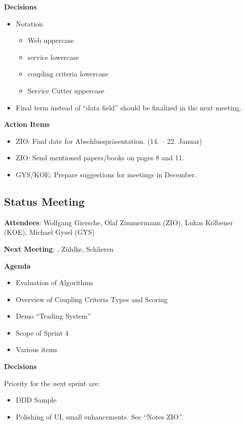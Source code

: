 \textbf{Decisions}

\begin{itemize}
\item Notation
	\begin{itemize}
	\item Web uppercase
	\item service lowercase
	\item coupling criteria lowercase
	\item Service Cutter uppercase
	\end{itemize}
\item Final term instead of \enquote{data field} should be finalized in the next meeting.
\end{itemize}
 
\textbf{Action Items}

\begin{itemize}
\item ZIO: Find date for Abschlusspräsentation. (14. – 22. Januar)
\item ZIO: Send mentioned papers/books on pages 8 and 11.
\item GYS/KOE: Prepare suggestions for meetings in December.
\end{itemize}



\subsection{Status Meeting }

\textbf{Attendees}: Wolfgang Giersche, Olaf Zimmermann (ZIO), Lukas Kölbener (KOE), Michael Gysel (GYS)
 
\textbf{Next Meeting}: , Zühlke, Schlieren

\textbf{Agenda}

\begin{itemize}
\item Evaluation of Algorithms
\item Overview of Coupling Criteria Types and Scoring
\item Demo \enquote{Trading System}
\item Scope of Sprint 4
\item Various items
\end{itemize}

\textbf{Decisions}
 
Priority for the next sprint are:
\begin{itemize}
\item DDD Sample
\item Polishing of UI, small enhancements. See \enquote{Notes ZIO}.
\end{itemize}

